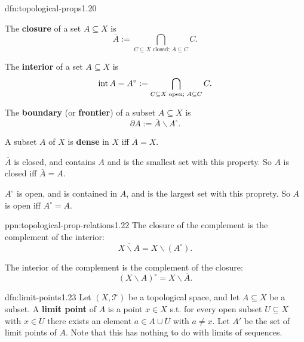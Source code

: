 \documentclass[landscape, 8pt]{extarticle}
\begin{document}
\begin{multicols}{3}
\begin{dfn}{dfn:topological-props}{1.20}
    \begin{enumerate-tight}
        \item The \textbf{closure} of a set $A \subseteq X$ is
            \[\overline{A} := \bigcap_{C \subseteq X \text{ closed; }A \subseteq C} C.\]
        \item The \textbf{interior} of a set $A \subseteq X$ is
            \[\operatorname{int} A = A^{\circ} := \bigcap_{C \subseteq X \text{ open; }A \subseteq C} C.\]
        \item The \textbf{boundary} (or \textbf{frontier}) of a subset $A \subseteq X$ is
            \[\partial A := \overline{A} \backslash A^{\circ}.\]
        \item A subset $A$ of $X$ is \textbf{dense} in $X$ iff $\overline{A} = X$.
    \end{enumerate-tight}
    $\overline{A}$ is closed, and contains $A$ and is the smallest set with this property. So $A$ is closed iff $\overline{A} = A$.

    $A^{\circ}$ is open, and is contained in $A$, and is the largest set with this proprety. So $A$ is open iff $A^{\circ} = A$.

\end{dfn}

\begin{ppn}{ppn:topological-prop-relations}{1.22}
    The closure of the complement is the complement of the interior:
    \[\overline{X \backslash A} = X \backslash (A^{\circ}).\]

    The interior of the complement is the complement of the closure:
    \[(X \backslash A)^{\circ} = X \backslash \overline{A}.\]
\end{ppn}

\begin{dfn}{dfn:limit-points}{1.23}
    Let $(X, \mathcal{T})$ be a topological space, and let $A \subseteq X$ be a subset. A \textbf{limit point} of $A$ is a point $x\in X$ s.t. for every open subset $U \subseteq X$ with $x\in U$ there exists an element $a\in A \cup U$ with $a \ne x$. Let $A'$ be the set of limit points of $A$.\newline
    Note that this has nothing to do with limits of sequences.
\end{dfn}


\end{multicols}
\end{document}
